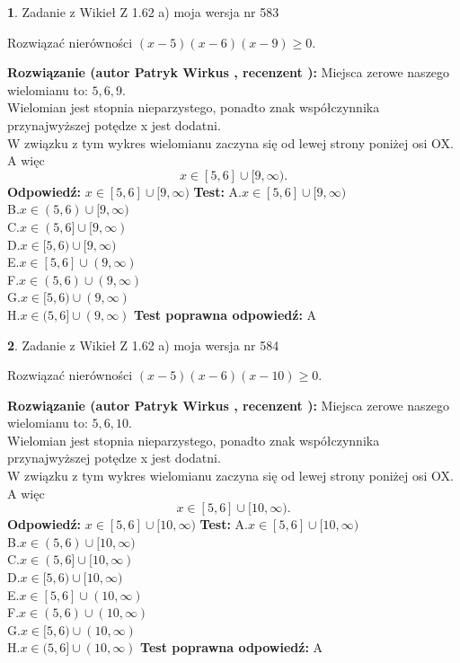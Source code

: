 \documentclass[12pt, a4paper]{article}
\theoremstyle{definition} %
\newtheorem{zad}{}
\newcommand{\zadStart}[1]{\begin{zad}#1\newline}
\newcommand{\zadStop}{\end{zad}}
\newcommand{\rozwStart}[2]{\noindent \textbf{Rozwiązanie (autor #1 , recenzent #2): }\newline}
\newcommand{\rozwStop}{\newline}
\newcommand{\odpStart}{\noindent \textbf{Odpowiedź:}\newline}
\newcommand{\odpStop}{\newline}
\newcommand{\testStart}{\noindent \textbf{Test:}\newline}
\newcommand{\testStop}{\newline}
\newcommand{\kluczStart}{\noindent \textbf{Test poprawna odpowiedź:}\newline}
\newcommand{\kluczStop}{\newline}
\begin{document}
\zadStart{Zadanie z Wikieł Z 1.62 a) moja wersja nr 583}

Rozwiązać nierówności $(x-5)(x-6)(x-9)\ge0$.
\zadStop
\rozwStart{Patryk Wirkus}{}
Miejsca zerowe naszego wielomianu to: $5, 6, 9$.\\
Wielomian jest stopnia nieparzystego, ponadto znak współczynnika przy\linebreak najwyższej potędze x jest dodatni.\\ W związku z tym wykres wielomianu zaczyna się od lewej strony poniżej osi OX. A więc $$x \in [5,6] \cup [9,\infty).$$
\rozwStop
\odpStart
$x \in [5,6] \cup [9,\infty)$
\odpStop
\testStart
A.$x \in [5,6] \cup [9,\infty)$\\
B.$x \in (5,6) \cup [9,\infty)$\\
C.$x \in (5,6] \cup [9,\infty)$\\
D.$x \in [5,6) \cup [9,\infty)$\\
E.$x \in [5,6] \cup (9,\infty)$\\
F.$x \in (5,6) \cup (9,\infty)$\\
G.$x \in [5,6) \cup (9,\infty)$\\
H.$x \in (5,6] \cup (9,\infty)$
\testStop
\kluczStart
A
\kluczStop



\zadStart{Zadanie z Wikieł Z 1.62 a) moja wersja nr 584}

Rozwiązać nierówności $(x-5)(x-6)(x-10)\ge0$.
\zadStop
\rozwStart{Patryk Wirkus}{}
Miejsca zerowe naszego wielomianu to: $5, 6, 10$.\\
Wielomian jest stopnia nieparzystego, ponadto znak współczynnika przy\linebreak najwyższej potędze x jest dodatni.\\ W związku z tym wykres wielomianu zaczyna się od lewej strony poniżej osi OX. A więc $$x \in [5,6] \cup [10,\infty).$$
\rozwStop
\odpStart
$x \in [5,6] \cup [10,\infty)$
\odpStop
\testStart
A.$x \in [5,6] \cup [10,\infty)$\\
B.$x \in (5,6) \cup [10,\infty)$\\
C.$x \in (5,6] \cup [10,\infty)$\\
D.$x \in [5,6) \cup [10,\infty)$\\
E.$x \in [5,6] \cup (10,\infty)$\\
F.$x \in (5,6) \cup (10,\infty)$\\
G.$x \in [5,6) \cup (10,\infty)$\\
H.$x \in (5,6] \cup (10,\infty)$
\testStop
\kluczStart
A
\kluczStop
\end{document}
